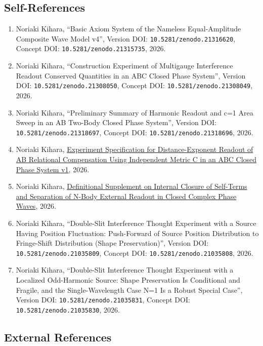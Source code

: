 \documentclass[
]{article}
\providecommand{\tightlist}{%
  \setlength{\itemsep}{0pt}\setlength{\parskip}{0pt}}
\begin{document}
\subsection{Self-References}\label{self-references}

\begin{enumerate}
\def\labelenumi{\arabic{enumi}.}
\tightlist
\item
  Noriaki Kihara, ``Basic Axiom System of the Nameless Equal-Amplitude
  Composite Wave Model v4'', Version DOI:
  \texttt{10.5281/zenodo.21316620}, Concept DOI:
  \texttt{10.5281/zenodo.21315735}, 2026.
\item
  Noriaki Kihara, ``Construction Experiment of Multigauge Interference
  Readout Conserved Quantities in an ABC Closed Phase System'', Version
  DOI: \texttt{10.5281/zenodo.21308050}, Concept DOI:
  \texttt{10.5281/zenodo.21308049}, 2026.
\item
  Noriaki Kihara, ``Preliminary Summary of Harmonic Readout and c=1 Area
  Sweep in an AB Two-Body Closed Phase System'', Version DOI:
  \texttt{10.5281/zenodo.21318697}, Concept DOI:
  \texttt{10.5281/zenodo.21318696}, 2026.
\item
  Noriaki Kihara,
  \href{ABC閉鎖位相系における独立計量CによるAB関係補償の距離指数読出し実験仕様書\%20v1.md}{Experiment
  Specification for Distance-Exponent Readout of AB Relational
  Compensation Using Independent Metric C in an ABC Closed Phase System
  v1}, 2026.
\item
  Noriaki Kihara,
  \href{閉鎖複素位相波における自己項の内部閉鎖とN体外部読出し分離に関する定義補足.md}{Definitional
  Supplement on Internal Closure of Self-Terms and Separation of N-Body
  External Readout in Closed Complex Phase Waves}, 2026.
\item
  Noriaki Kihara, ``Double-Slit Interference Thought Experiment with a
  Source Having Position Fluctuation: Push-Forward of Source Position
  Distribution to Fringe-Shift Distribution (Shape Preservation)'',
  Version DOI: \texttt{10.5281/zenodo.21035809}, Concept DOI:
  \texttt{10.5281/zenodo.21035808}, 2026.
\item
  Noriaki Kihara, ``Double-Slit Interference Thought Experiment with a
  Localized Odd-Harmonic Source: Shape Preservation Is Conditional and
  Fragile, and the Single-Wavelength Case N=1 Is a Robust Special
  Case'', Version DOI: \texttt{10.5281/zenodo.21035831}, Concept DOI:
  \texttt{10.5281/zenodo.21035830}, 2026.
\end{enumerate}

\subsection{External References}\label{external-references}
\end{document}
